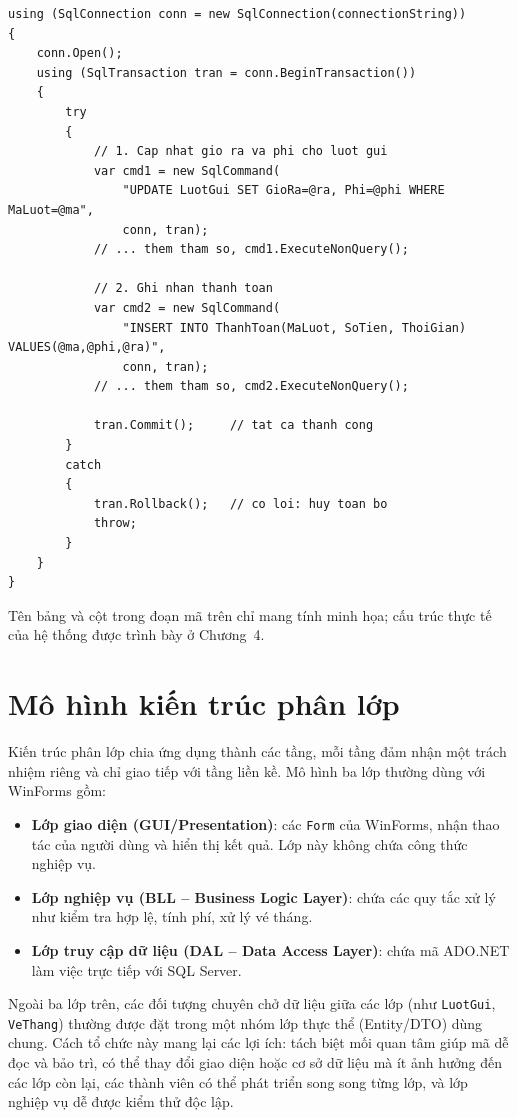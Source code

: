 \begin{lstlisting}
using (SqlConnection conn = new SqlConnection(connectionString))
{
    conn.Open();
    using (SqlTransaction tran = conn.BeginTransaction())
    {
        try
        {
            // 1. Cap nhat gio ra va phi cho luot gui
            var cmd1 = new SqlCommand(
                "UPDATE LuotGui SET GioRa=@ra, Phi=@phi WHERE MaLuot=@ma",
                conn, tran);
            // ... them tham so, cmd1.ExecuteNonQuery();

            // 2. Ghi nhan thanh toan
            var cmd2 = new SqlCommand(
                "INSERT INTO ThanhToan(MaLuot, SoTien, ThoiGian) VALUES(@ma,@phi,@ra)",
                conn, tran);
            // ... them tham so, cmd2.ExecuteNonQuery();

            tran.Commit();     // tat ca thanh cong
        }
        catch
        {
            tran.Rollback();   // co loi: huy toan bo
            throw;
        }
    }
}
\end{lstlisting}

Tên bảng và cột trong đoạn mã trên chỉ mang tính minh họa; cấu trúc thực tế của hệ thống được trình bày ở Chương~4.

\section{Mô hình kiến trúc phân lớp}

Kiến trúc phân lớp chia ứng dụng thành các tầng, mỗi tầng đảm nhận một trách nhiệm riêng và chỉ giao tiếp với tầng liền kề. Mô hình ba lớp thường dùng với WinForms gồm:

\begin{itemize}
  \item \textbf{Lớp giao diện (GUI/Presentation)}: các \texttt{Form} của WinForms, nhận thao tác của người dùng và hiển thị kết quả. Lớp này không chứa công thức nghiệp vụ.
  \item \textbf{Lớp nghiệp vụ (BLL -- Business Logic Layer)}: chứa các quy tắc xử lý như kiểm tra hợp lệ, tính phí, xử lý vé tháng.
  \item \textbf{Lớp truy cập dữ liệu (DAL -- Data Access Layer)}: chứa mã ADO.NET làm việc trực tiếp với SQL Server.
\end{itemize}

Ngoài ba lớp trên, các đối tượng chuyên chở dữ liệu giữa các lớp (như \texttt{LuotGui}, \texttt{VeThang}) thường được đặt trong một nhóm lớp thực thể (Entity/DTO) dùng chung. Cách tổ chức này mang lại các lợi ích: tách biệt mối quan tâm giúp mã dễ đọc và bảo trì, có thể thay đổi giao diện hoặc cơ sở dữ liệu mà ít ảnh hưởng đến các lớp còn lại, các thành viên có thể phát triển song song từng lớp, và lớp nghiệp vụ dễ được kiểm thử độc lập.


